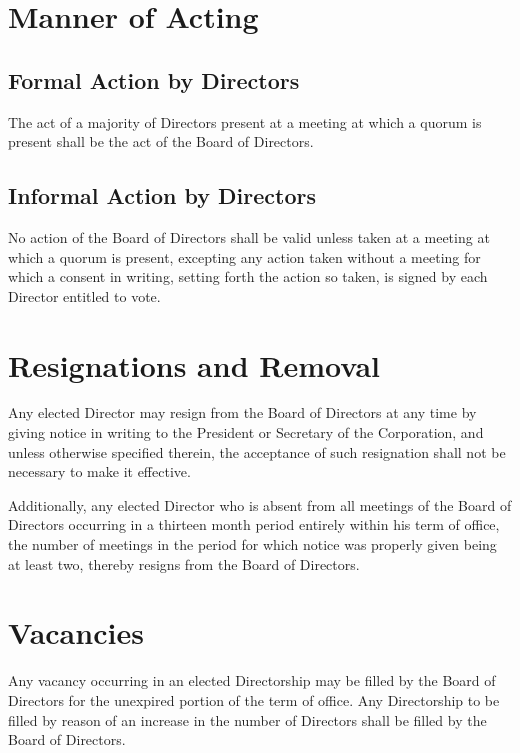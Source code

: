 \section{Manner of Acting}

\subsection{Formal Action by Directors}

The act of a majority of Directors present at a meeting at which a quorum is
present shall be the act of the Board of Directors.

\subsection{Informal Action by Directors}

No action of the Board of Directors shall be valid unless taken at a meeting at
which a quorum is present, excepting any action taken without a meeting for
which a consent in writing, setting forth the action so taken, is signed by each
Director entitled to vote.

\section{Resignations and Removal}

Any elected Director may resign from the Board of Directors at any time by
giving notice in writing to the President or Secretary of the Corporation, and
unless otherwise specified therein, the acceptance of such resignation shall not
be necessary to make it effective.

Additionally, any elected Director who is absent from all meetings of the Board
of Directors occurring in a thirteen month period entirely within his term of
office, the number of meetings in the period for which notice was properly given
being at least two, thereby resigns from the Board of Directors.

\section{Vacancies}

Any vacancy occurring in an elected Directorship may be filled by the Board of
Directors for the unexpired portion of the term of office.  Any Directorship to
be filled by reason of an increase in the number of Directors shall be filled by
the Board of Directors.

